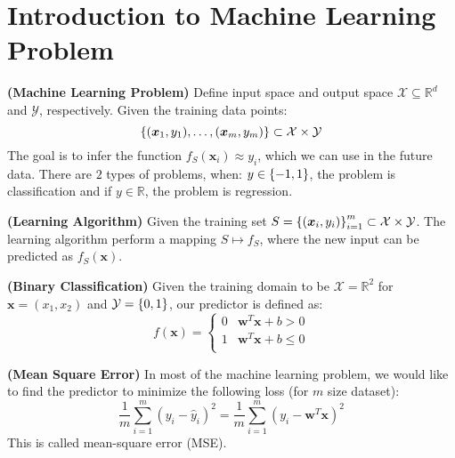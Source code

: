 \section{Introduction to Machine Learning Problem}

\begin{definition}{\textbf{(Machine Learning Problem)}}
    Define input space and output space $\mathcal{X} \subseteq \mathbb{R}^d$ and $\mathcal{Y}$, respectively. Given the training data points:
    \begin{equation*}
        \left\{ (\boldsymbol x_1, y_1),\dots,(\boldsymbol x_m, y_m) \right\} \subset \mathcal{X} \times \mathcal{Y}
    \end{equation*}
    The goal is to infer the function $f_S(\boldsymbol x_i)\approx y_i$, which we can use in the future data. There are $2$ types of problems, when: $y \in \left\{ -1, 1 \right\}$, the problem is classification and if $y \in \mathbb{R}$, the problem is regression.
\end{definition}

\begin{definition}{\textbf{(Learning Algorithm)}}
    Given the training set $S = \left\{ (\boldsymbol x_i, y_i) \right\}^m_{i=1} \subset \mathcal{X} \times \mathcal{Y}$. The learning algorithm perform a mapping $S \mapsto f_S$, where the new input can be predicted as $f_S(\boldsymbol x)$.
\end{definition}

\begin{definition}{\textbf{(Binary Classification)}}
    Given the training domain to be $\mathcal{X} = \mathbb{R}^2$  for $\boldsymbol x = (x_1,x_2)$ and $\mathcal{Y} = \left\{ 0, 1 \right\}$, our predictor is defined as:
    \begin{equation*}
        f(\boldsymbol x) = \begin{cases}
            0 & \boldsymbol w^T\boldsymbol x + b > 0 \\
            1 & \boldsymbol w^T\boldsymbol x + b \le 0 \\
        \end{cases}
    \end{equation*}
\end{definition}

\begin{definition}{\textbf{(Mean Square Error)}}
    In most of the machine learning problem, we would like to find the predictor to minimize the following loss (for $m$ size dataset):
    \begin{equation*}
        \frac{1}{m}\sum^m_{i=1}(y_i - \hat{y}_i)^2 = \frac{1}{m}\sum^m_{i=1}(y_i - \boldsymbol w^T\boldsymbol x)^2 
    \end{equation*}
    This is called mean-square error (MSE).
\end{definition}

